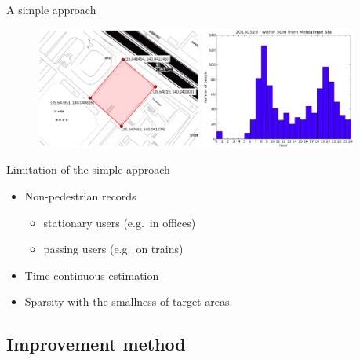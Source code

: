 \begin{frame}{A simple approach}

\begin{figure}
\includegraphics[height = 4cm]{pic4.png}
\includegraphics[height = 4cm]{pic5.png}
\end{figure}

\end{frame}

\begin{frame}{Limitation of the simple approach}

\begin{itemize}
\itemsep1pt\parskip0pt
\item
  Non-pedestrian records

  \begin{itemize}
  \itemsep1pt\parskip0pt
  \item
    stationary users (e.g.~in offices)
  \item
    passing users (e.g.~on trains)
  \end{itemize}
\item
  Time continuous estimation
\item
  Sparsity with the smallness of target areas.
\end{itemize}

\end{frame}

\subsection{Improvement method}\label{improvement-method}

